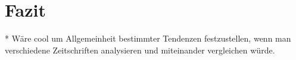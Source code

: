 \section{Fazit}

\begin{comment}
    * Einleitung und Fazit müssen zusammenpassen.
    * sind die Erkenntnisse im Fazit aus der Arbeit ableitbar?
    * Vorgehensweise zusammenfassen

Kritische Zusammenfassung
\begin{itemize}
    \item was war in den Texten nicht so gelungen?
    \item welche Fragen sind offen geblieben?
    \item in welche Richtung kann noch weiter geforscht werden?
    \item was sind gegnerische Meinungen zum Thema?
\end{itemize}
\end{comment}



* Wäre cool um Allgemeinheit bestimmter Tendenzen festzustellen, wenn man verschiedene Zeitschriften analysieren und miteinander vergleichen würde.
